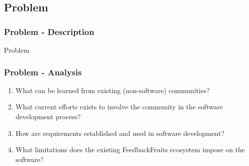 \subsection{Problem}

\begin{frame}\frametitle{Problem - Description}
    \begin{alertblock}{Problem}
	\end{alertblock}
	
\end{frame}


\begin{frame}\frametitle{Problem - Analysis}
	\begin{enumerate}
        \item What can be learned from existing (non-software) communities?
        \item What current efforts exists to involve the community in the software development process?
        \item How are requirements established and used in software development?
        \item What limitations does the existing FeedbackFruits ecosystem impose on the software?
    \end{enumerate}
\end{frame}


